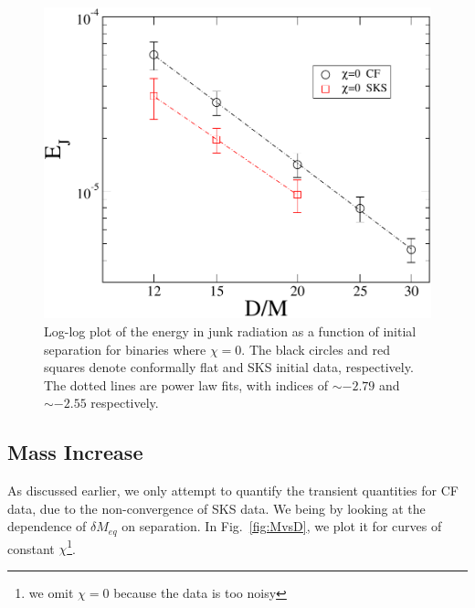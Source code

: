 \documentclass[aps,prd,amsmath,floatfix,twocolumn,superscriptaddress,nofootinbib,showpacs]{revtex4-1}
\theoremstyle{plain}
\theoremstyle{definition}
\begin{document}


\begin{figure}
\includegraphics[scale=0.5]{EvsD}
 \caption{Log-log plot of the energy in junk radiation as a function
   of initial separation for binaries where $\chi=0$. The black circles and red squares denote conformally flat and SKS initial
   data, respectively. The dotted lines are
   power law fits, with indices of $\sim -2.79$ and $\sim
   -2.55$ respectively.}
 \label{fig:EvsD}
\end{figure}

\subsection{Mass Increase}
\label{subsec:MassIncrease}
As discussed earlier, we only attempt to quantify the transient
quantities for CF data, due to the non-convergence of SKS data. We
being by looking at the dependence of $\delta M_{eq}$ on
separation. In Fig.~\ref{fig:MvsD}, we plot it for curves of
constant $\chi$\footnote{we omit $\chi=0$ because the data is too
  noisy}. 
\end{document}
